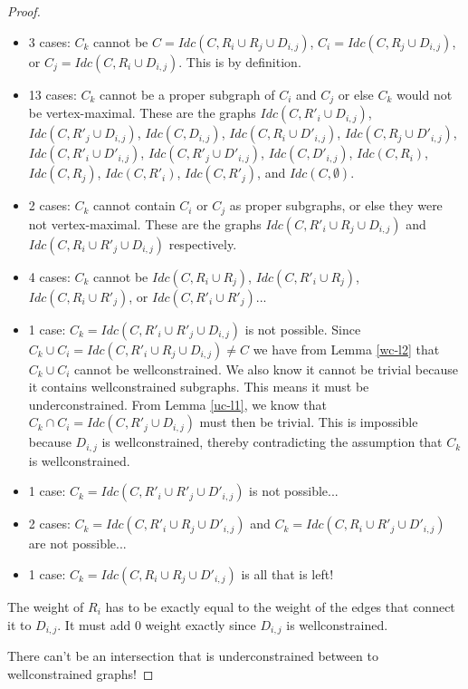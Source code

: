 \documentclass[11pt]{article}
\begin{document}
\begin{proof}
\begin{itemize}
    \item 3 cases: $C_k$ cannot be $C=Idc(C,R_i\cup R_j\cup D_{i,j})$, $C_i=Idc(C,R_j\cup D_{i,j})$, or $C_j=Idc(C,R_i\cup D_{i,j})$. This is by definition.
    \item 13 cases: $C_k$ cannot be a proper subgraph of $C_i$ and $C_j$ or else $C_k$ would not be vertex-maximal. These are the graphs $Idc(C,R'_i\cup D_{i,j})$, $Idc(C,R'_j\cup D_{i,j})$, $Idc(C, D_{i,j})$, $Idc(C,R_i\cup D'_{i,j})$, $Idc(C,R_j\cup D'_{i,j})$, $Idc(C,R'_i\cup D'_{i,j})$, $Idc(C,R'_j\cup D'_{i,j})$, $Idc(C, D'_{i,j})$, $Idc(C,R_i)$, $Idc(C,R_j)$, $Idc(C,R'_i)$, $Idc(C,R'_j)$, and $Idc(C,\emptyset)$.
    \item 2 cases: $C_k$ cannot contain $C_i$ or $C_j$ as proper subgraphs, or else they were not vertex-maximal. These are the graphs $Idc(C,R'_i\cup R_j\cup D_{i,j})$ and $Idc(C,R_i\cup R'_j\cup D_{i,j})$ respectively.
    \item 4 cases: $C_k$ cannot be $Idc(C,R_i\cup R_j)$, $Idc(C,R'_i\cup R_j)$, $Idc(C,R_i\cup R'_j)$, or $Idc(C,R'_i\cup R'_j)$...
    \item 1 case: $C_k=Idc(C,R'_i\cup R'_j\cup D_{i,j})$ is not possible. Since $C_k\cup C_i = Idc(C,R'_i\cup R_j\cup D_{i,j})\neq C$ we have from Lemma \ref{wc-l2} that $C_k\cup C_i$ cannot be wellconstrained. We also know it cannot be trivial because it contains wellconstrained subgraphs. This means it must be underconstrained. From Lemma \ref{uc-l1}, we know that $C_k\cap C_i=Idc(C,R'_j\cup D_{i,j})$ must then be trivial. This is impossible because $D_{i,j}$ is wellconstrained, thereby contradicting the assumption that $C_k$ is wellconstrained.
    \item 1 case: $C_k=Idc(C,R'_i\cup R'_j\cup D'_{i,j})$ is not possible...
    \item 2 cases: $C_k=Idc(C,R'_i\cup R_j\cup D'_{i,j})$ and $C_k=Idc(C,R_i\cup R'_j\cup D'_{i,j})$ are not possible...
    \item 1 case: $C_k=Idc(C,R_i\cup R_j\cup D'_{i,j})$ is all that is left!
\end{itemize}

The weight of $R_i$ has to be exactly equal to the weight of the edges that connect it to $D_{i,j}$. It must add 0 weight exactly since $D_{i,j}$ is wellconstrained.

There can't be an intersection that is underconstrained between to wellconstrained graphs!


\end{proof}
\end{document}
